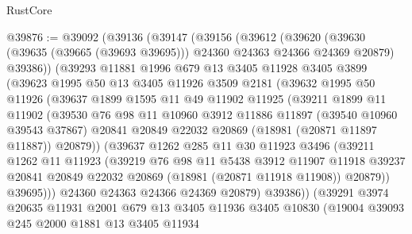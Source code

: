\begin{lexlean}{RustCore}
\begin{coremodule}
@39876 := @39092
    (@39136
      (@39147
        (@39156
          (@39612
            (@39620
              (@39630 (@39635 (@39665 (@39693 @39695))) @24360 @24363 @24366 @24369 @20879)
              @39386))
          (@39293
            @11881
            @1996
            @679
            @13
            @3405
            @11928
            @3405
            @3899
            (@39623
              @1995
              @50
              @13
              @3405
              @11926
              @3509
              @2181
              (@39632
                @1995
                @50
                @11926
                (@39637
                  @1899
                  @1595
                  @11
                  @49
                  @11902
                  @11925
                  (@39211
                    @1899
                    @11
                    @11902
                    (@39530
                      @76
                      @98
                      @11
                      @10960
                      @3912
                      @11886
                      @11897
                      (@39540 @10960 @39543 @37867)
                      @20841
                      @20849
                      @22032
                      @20869
                      (@18981 (@20871 @11897 @11887))
                      @20879))
                  (@39637
                    @1262
                    @285
                    @11
                    @30
                    @11923
                    @3496
                    (@39211
                      @1262
                      @11
                      @11923
                      (@39219
                        @76
                        @98
                        @11
                        @5438
                        @3912
                        @11907
                        @11918
                        @39237
                        @20841
                        @20849
                        @22032
                        @20869
                        (@18981 (@20871 @11918 @11908))
                        @20879))
                    @39695)))
              @24360
              @24363
              @24366
              @24369
              @20879)
            @39386))
        (@39291
          @3974
          @20635
          @11931
          @2001
          @679
          @13
          @3405
          @11936
          @3405
          @10830
          (@19004
            @39093
            @245
            @2000
            @1881
            @13
            @3405
            @11934

\end{coremodule}
\end{lexlean}
